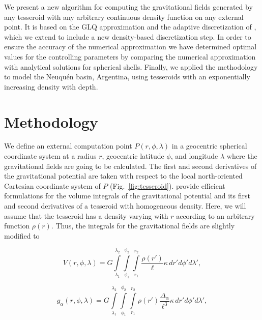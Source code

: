 \documentclass[extra, referee]{gji}
\begin{document}
We present a new algorithm for computing the gravitational fields generated by any
tesseroid with any arbitrary continuous density function on any external point.
It is based on the GLQ approximation and the adaptive discretization of
\citet{Uieda2016}, which we extend to include a new density-based discretization step.
In order to ensure the accuracy of the numerical approximation we have
determined optimal values for the controlling parameters by
comparing the numerical approximation with analytical solutions for
spherical shells.
Finally, we applied the methodology to model the Neuqu\'en basin, Argentina, using
tesseroids with an exponentially increasing density with depth.



\section{Methodology}

We define an external computation point $P(r, \phi, \lambda)$ in a geocentric spherical
coordinate system at a radius $r$, geocentric latitude $\phi$, and longitude $\lambda$
where the gravitational fields are going to be calculated.
The first and second derivatives of the gravitational potential are taken with
respect to the local north-oriented Cartesian coordinate system of $P$
(Fig.~\ref{fig:tesseroid}).
\citet{Grombein2013} provide efficient formulations for the volume integrals of the
gravitational potential and its first and second derivatives of a tesseroid with
homogeneous density.
Here, we will assume that the tesseroid has a density varying with $r$ according to an
arbitrary function $\rho(r)$.
Thus, the integrals for the gravitational fields are slightly modified to

\begin{equation}
    V(r,\phi,\lambda) = G
    \int\limits_{\lambda_1}^{\lambda_2}
    \int\limits_{\phi_1}^{\phi_2}
    \int\limits_{r_1}^{r_2}
    \frac{\rho(r')}{\ell} \kappa \,  dr' d\phi' d\lambda',
\label{eq:tesseroid-pot}
\end{equation}

\begin{equation}
    g_{\alpha}(r,\phi,\lambda) = G
    \int\limits_{\lambda_1}^{\lambda_2}
    \int\limits_{\phi_1}^{\phi_2}
    \int\limits_{r_1}^{r_2}
    \rho(r') \frac{\Delta_\alpha}{\ell^3}
    \kappa \, dr' d\phi' d\lambda',
\label{eq:tesseroid-grav}
\end{equation}
\end{document}
